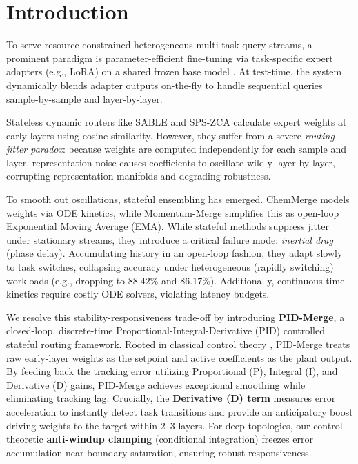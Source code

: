 \section{Introduction}
\label{sec:intro}

To serve resource-constrained heterogeneous multi-task query streams, a prominent paradigm is parameter-efficient fine-tuning via task-specific expert adapters (e.g., LoRA) on a shared frozen base model \cite{hu2021lora, dettmers2023qlora}. At test-time, the system dynamically blends adapter outputs on-the-fly to handle sequential queries sample-by-sample and layer-by-layer.

Stateless dynamic routers like SABLE \cite{sable} and SPS-ZCA \cite{spszca} calculate expert weights at early layers using cosine similarity. However, they suffer from a severe \emph{routing jitter paradox}: because weights are computed independently for each sample and layer, representation noise causes coefficients to oscillate wildly layer-by-layer, corrupting representation manifolds and degrading robustness.

To smooth out oscillations, stateful ensembling has emerged. ChemMerge \cite{chemmerge} models weights via ODE kinetics, while Momentum-Merge \cite{momentum_merge} simplifies this as open-loop Exponential Moving Average (EMA). While stateful methods suppress jitter under stationary streams, they introduce a critical failure mode: \emph{inertial drag} (phase delay). Accumulating history in an open-loop fashion, they adapt slowly to task switches, collapsing accuracy under heterogeneous (rapidly switching) workloads (e.g., dropping to $88.42\%$ and $86.17\%$). Additionally, continuous-time kinetics require costly ODE solvers, violating latency budgets.

We resolve this stability-responsiveness trade-off by introducing \textbf{PID-Merge}, a closed-loop, discrete-time Proportional-Integral-Derivative (PID) controlled stateful routing framework. Rooted in classical control theory \cite{astrom_pid, ziegler1942optimum}, PID-Merge treats raw early-layer weights as the setpoint and active coefficients as the plant output. By feeding back the tracking error utilizing Proportional (P), Integral (I), and Derivative (D) gains, PID-Merge achieves exceptional smoothing while eliminating tracking lag. Crucially, the \textbf{Derivative (D) term} measures error acceleration to instantly detect task transitions and provide an anticipatory boost driving weights to the target within 2--3 layers. For deep topologies, our control-theoretic \textbf{anti-windup clamping} (conditional integration) freezes error accumulation near boundary saturation, ensuring robust responsiveness.

